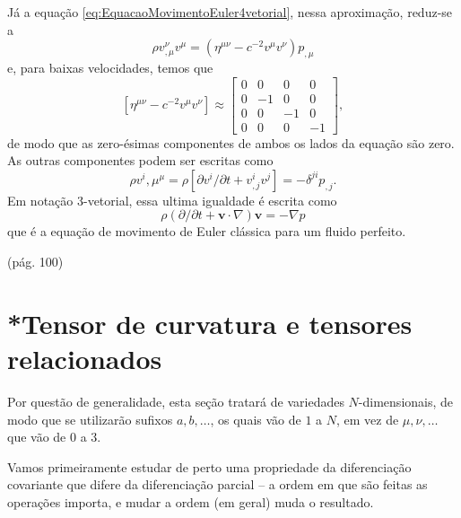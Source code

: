 Já a equação \eqref{eq:EquacaoMovimentoEuler4vetorial}, nessa aproximação, reduz-se a 
\[
	\rho v_{, \mu}^{\nu} v^{\mu}=\left(\eta^{\mu \nu}-c^{-2} v^{\mu} v^{\nu}\right) p_{, \mu}
\]
e, para baixas velocidades, temos que
\[
\left[\eta^{\mu \nu}-c^{-2} v^{\mu} v^{\nu}\right] \approx
\left[\begin{array}{rrrr}{0} & {0} & {0} & {0} \\ {0} & {-1} & {0} & {0} \\ {0} & {0} & {-1} & {0} \\ {0} & {0} & {0} & {-1}\end{array}\right],
\]
de modo que as zero-ésimas componentes de ambos os lados da equação são zero. As outras componentes podem ser escritas como
\[
	\rho v^{i}, \mu^{\mu}= \rho\left[\partial v^{i} / \partial t+v_{, j}^{i} v^{j}\right]=-\delta^{j i} p_{, j} .\]
Em notação 3-vetorial, essa ultima igualdade é escrita como
\begin{equation}\label{eq:EquacaoMovimentoEulerClassica3vetorial}
	\boxed{
		\rho(\partial / \partial t+\mathbf{v} \cdot \nabla) \mathbf{v}=-\nabla p
	}
\end{equation}
que é a equação de movimento de Euler clássica para um fluido perfeito.

(pág. 100)




















\section{*Tensor de curvatura e tensores relacionados}\label{sec:TensorCurvatura}

Por questão de generalidade, esta seção tratará de variedades $N$-dimensionais, de modo que se utilizarão sufixos $a,b,\dots$, os quais vão de $1$ a $N$, em vez de $\mu,\nu,\dots$ que vão de $0$ a $3$. 

Vamos primeiramente estudar de perto uma propriedade da diferenciação covariante que difere da diferenciação parcial -- a ordem em que são feitas as operações importa, e mudar a ordem (em geral) muda o resultado.

